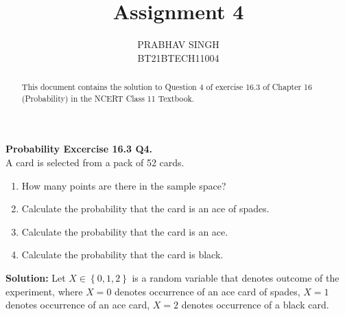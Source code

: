 \documentclass[journal,12pt,twocolumn]{IEEEtran}
\title{Assignment 4}
\author{PRABHAV SINGH\\BT21BTECH11004}
\date{}
\providecommand{\cbrak}[1]{\ensuremath{\left\{#1\right\}}}
\newcommand{\solution}{\noindent \textbf{Solution: }}
\begin{document}
	\maketitle
	\begin{abstract}
		This document contains the solution to Question 4 of exercise 16.3 of Chapter 16 (Probability) in the NCERT Class 11 Textbook.
	\end{abstract}
	
	\textbf{Probability Excercise 16.3 Q4.}\\
	A card is selected from a pack of 52 cards.
	\begin{enumerate}[label=(\roman{enumi})]
		\item How many points are there in the sample space?
		\item Calculate the probability that the card is an ace of spades.
		\item Calculate the probability that the card is an ace.
		\item Calculate the probability that the card is black.
	\end{enumerate} 
	\solution Let $X\in \cbrak{0,1,2}$ is a random variable that denotes outcome of the experiment, where $X = 0$ denotes occurrence of an ace card of spades, $X = 1$ denotes occurrence of an ace card, $X = 2$ denotes occurrence of a black card.
\end{document}
